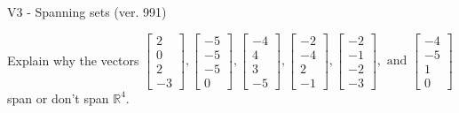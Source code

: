 \begin{exercise}
  \begin{exerciseTitle}V3 - Spanning sets (ver. 991)\end{exerciseTitle}
  \begin{exerciseStatement}
    Explain why the vectors \(\left[\begin{array}{r}
2 \\
0 \\
2 \\
-3
\end{array}\right] , \left[\begin{array}{r}
-5 \\
-5 \\
-5 \\
0
\end{array}\right] , \left[\begin{array}{r}
-4 \\
4 \\
3 \\
-5
\end{array}\right] , \left[\begin{array}{r}
-2 \\
-4 \\
2 \\
-1
\end{array}\right] , \left[\begin{array}{r}
-2 \\
-1 \\
-2 \\
-3
\end{array}\right] , \text{ and } \left[\begin{array}{r}
-4 \\
-5 \\
1 \\
0
\end{array}\right]\) span or don't span \(\mathbb{R}^4\). 
	



\end{exerciseStatement}
\end{exercise}
